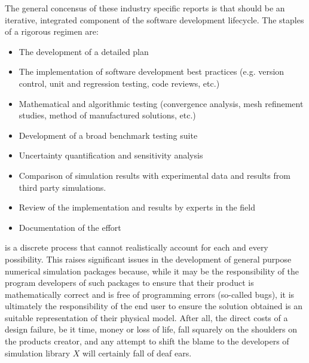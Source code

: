 The general concensus of these industry specific \VV reports is that \VV should be an iterative, integrated component of the software development lifecycle. The staples of a rigorous \VV regimen are:

\begin{itemize}
 \item The development of a detailed \VV plan
 \item The implementation of software development best practices (e.g. version control, unit and regression testing, code reviews, etc.)
 \item Mathematical and algorithmic testing (convergence analysis, mesh refinement studies, method of manufactured solutions, etc.)
 \item Development of a broad benchmark testing suite
 \item Uncertainty quantification and sensitivity analysis
 \item Comparison of simulation results with experimental data and results from third party simulations. 
 \item Review of the implementation and results by experts in the field
 \item Documentation of the \VV effort
\end{itemize}

\VV is a discrete process that cannot realistically account for each and every possibility. This raises significant issues in the development of general purpose numerical simulation packages because, while it may be the responsibility of the program developers of such packages to ensure that their product is mathematically correct and is free of programming errors (so-called bugs), it is ultimately the responsibility of the end user to ensure the solution obtained is an suitable representation of their physical model. After all, the direct costs of a design failure, be it time, money or loss of life, fall squarely on the shoulders on the products creator, and any attempt to shift the blame to the developers of simulation library $X$ will certainly fall of deaf ears. 

